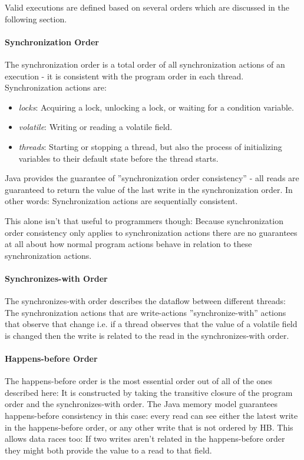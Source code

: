 \documentclass[main]{subfiles}
\begin{document}
Valid executions are defined based on several orders which are discussed in the following section.

\paragraph{Synchronization Order} \label{synchronization order}
The synchronization order is a total order of all synchronization actions of an execution - it is consistent with the program order in each thread. Synchronization actions are:

\begin{itemize}
    \item \textit{locks}: Acquiring a lock, unlocking a lock, or waiting for a condition variable.
    \item \textit{volatile}: Writing or reading a volatile field.
    \item \textit{threads}: Starting or stopping a thread, but also the process of initializing variables to their default state before the thread starts.
\end{itemize}

Java provides the guarantee of ''synchronization order consistency'' - all reads are guaranteed to return the value of the last write in the synchronization order. In other words: Synchronization actions are sequentially consistent.

This alone isn't that useful to programmers though: Because synchronization order consistency only applies to synchronization actions there are no guarantees at all about how normal program actions behave in relation to these synchronization actions.

\paragraph{Synchronizes-with Order} \label{synchronizes-with order}
The synchronizes-with order describes the dataflow between different threads: The synchronization actions that are write-actions ''synchronize-with'' actions that observe that change i.e. if a thread observes that the value of a volatile field is changed then the write is related to the read in the synchronizes-with order.

\paragraph{Happens-before Order} \label{happens-before order}
The happens-before order is the most essential order out of all of the ones described here: It is constructed by taking the transitive closure of the program order and the synchronizes-with order. The Java memory model guarantees happens-before consistency in this case: every read can see either the latest write in the happens-before order, or any other write that is not ordered by HB. This allows data races too: If two writes aren't related in the happens-before order they might both provide the value to a read to that field.
\end{document}
